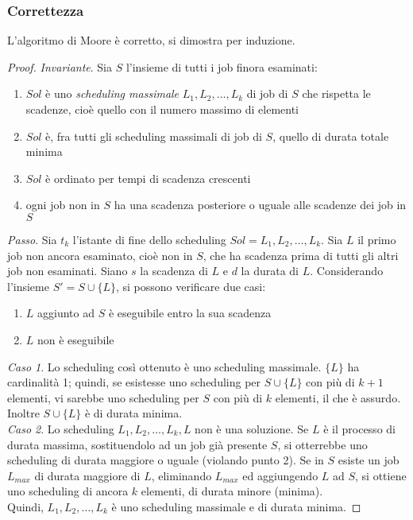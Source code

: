 \documentclass[11pt]{book}
\begin{document}
\subsubsection{Correttezza}
L'algoritmo di Moore è corretto, si dimostra per induzione.
\begin{proof}
    \textit{Invariante}. Sia $S$ l'insieme di tutti i job finora esaminati:
    \begin{enumerate}
        \item $Sol$ è uno \textit{scheduling massimale} $L_1,L_2,\dots,L_k$ di job di $S$ che rispetta le scadenze, cioè 
        quello con il numero massimo di elementi 
        \item $Sol$ è, fra tutti gli scheduling massimali di job di $S$, quello di durata totale minima 
        \item $Sol$ è ordinato per tempi di scadenza crescenti
        \item ogni job non in $S$ ha una scadenza posteriore o uguale alle scadenze dei job in $S$ 
    \end{enumerate}
    \textit{Passo}. Sia $t_k$ l'istante di fine dello scheduling $Sol=L_1,L_2,\dots,L_k$. Sia $L$ il primo job non ancora 
    esaminato, cioè non in $S$, che ha scadenza prima di tutti gli altri job non esaminati. Siano $s$ la scadenza di $L$ 
    e $d$ la durata di $L$. Considerando l'insieme $S'=S\cup \{L\}$, si possono verificare due casi:
    \begin{enumerate}
        \item $L$ aggiunto ad $S$ è eseguibile entro la sua scadenza 
        \item $L$ non è eseguibile
    \end{enumerate}
    \textit{Caso 1}. Lo scheduling così ottenuto è uno scheduling massimale. $\{L\}$ ha cardinalità 1; quindi, se esistesse 
    uno scheduling per $S\cup \{L\}$ con più di $k+1$ elementi, vi sarebbe uno scheduling per $S$ con più di $k$ elementi,
    il che è assurdo. Inoltre $S\cup \{L\}$ è di durata minima.\\ 
    \textit{Caso 2}. Lo scheduling $L_1,L_2,\dots,L_k,L$ non è una soluzione. Se $L$ è il processo di durata massima, sostituendolo 
    ad un job già presente $S$, si otterrebbe uno scheduling di durata maggiore o uguale (violando punto 2). Se in $S$ 
    esiste un job $L_{max}$ di durata maggiore di $L$, eliminando $L_{max}$ ed aggiungendo $L$ ad $S$, si ottiene uno 
    scheduling di ancora $k$ elementi, di durata minore (minima).\\
    Quindi, $L_1,L_2,\dots,L_k$ è uno scheduling massimale e di durata minima.
\end{proof}
\end{document}
